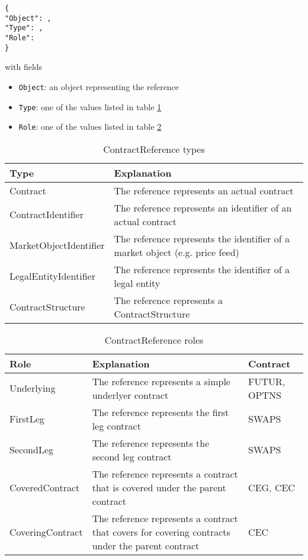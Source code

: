 \documentclass[9pt,oneside]{amsart}
\begin{document}
\begin{multicols}{2}
\begin{verbatim}
{
"Object": ,
"Type": ,
"Role":
}
\end{verbatim}

with fields

\begin{itemize}
	\item[] \verb'Object': an object representing the reference
	\item[] \verb'Type': one of the values listed in table \ref{tbl:struct-types}
	\item[] \verb'Role': one of the values listed in table \ref{tbl:struct-roles}
\end{itemize}


\begin{table}[H]
	\centering
	\begin{tabular}{| p{1.2in}p{1.7in} |}
	\hline
	\textbf{Type} & \textbf{Explanation} \\
	\hline
	Contract & The reference represents an actual contract \\
	\hline
	ContractIdentifier & The reference represents an identifier of an actual contract \\
	\hline
	MarketObjectIdentifier & The reference represents the identifier of a market object (e.g. price feed) \\
	\hline
	LegalEntityIdentifier & The reference represents the identifier of a legal entity \\
	\hline
	ContractStructure & The reference represents a ContractStructure \\
	\hline
	\end{tabular}
	\caption{ContractReference types}
	\label{tbl:struct-types}
\end{table}


\begin{table}[H]
	\centering
	\begin{tabular}{| p{1.0in}p{1.4in}p{0.5in} |}
	\hline
	\textbf{Role} & \textbf{Explanation} & \textbf{Contract} \\
	\hline
	Underlying & The reference represents a simple underlyer contract & FUTUR, OPTNS \\
	\hline
	FirstLeg & The reference represents the first leg contract & SWAPS \\
	\hline
	SecondLeg & The reference represents the second leg contract & SWAPS \\
	\hline
	CoveredContract & The reference represents a contract that is covered under the parent contract & CEG, CEC \\
	\hline
	CoveringContract & The reference represents a contract that covers for covering contracts under the parent contract & CEC \\
	\hline
	\end{tabular}
	\caption{ContractReference roles}
	\label{tbl:struct-roles}
\end{table}



\end{multicols}
\end{document}
